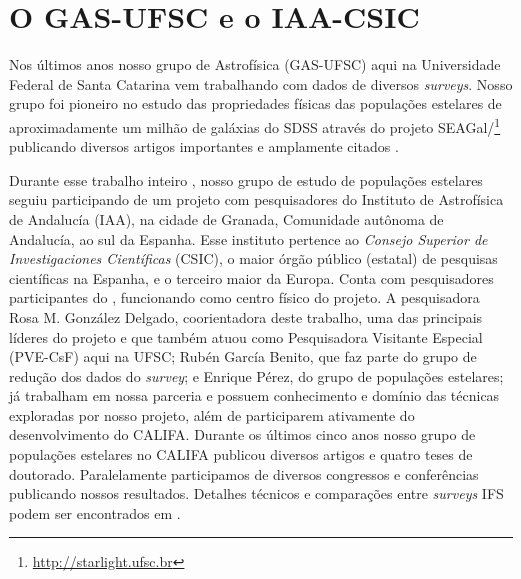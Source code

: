 \section{O GAS-UFSC e o IAA-CSIC}
\label{sec:intro:UFSCeIAA}

Nos últimos anos nosso grupo de Astrofísica (GAS-UFSC) aqui na Universidade Federal de Santa Catarina vem trabalhando com dados de diversos {\em surveys}. Nosso grupo foi pioneiro no estudo das propriedades físicas das populações estelares de aproximadamente um milhão de galáxias do SDSS através do projeto SEAGal/\starlight\footnote{\href{http://starlight.ufsc.br}{http://starlight.ufsc.br}} publicando diversos artigos importantes e amplamente citados \citep[e.g., ][]{CidFernandes.etal.2005a, Mateus.etal.2006a, Stasinska.etal.2006a, Asari.etal.2007a, Stasinska.etal.2008a, CidFernandes.etal.2011a}.

Durante esse trabalho inteiro , nosso grupo de estudo de populações estelares seguiu participando de um projeto com pesquisadores do Instituto de Astrofísica de Andalucía (IAA), na cidade de Granada, Comunidade autônoma de Andalucía, ao sul da Espanha. Esse instituto pertence ao {\em Consejo Superior de Investigaciones Científicas} (CSIC), o maior órgão público (estatal) de pesquisas científicas na Espanha, e o terceiro maior da Europa. Conta com pesquisadores participantes do \CALS, funcionando como centro físico do projeto. A pesquisadora Rosa M. González Delgado, coorientadora deste trabalho, uma das principais líderes do projeto e que também atuou como Pesquisadora Visitante Especial (PVE-CsF) aqui na UFSC; Rubén García Benito, que faz parte do grupo de redução dos dados do {\em survey}; e Enrique Pérez, do grupo de populações estelares; já trabalham em nossa parceria e possuem conhecimento e domínio das técnicas exploradas por nosso projeto, além de participarem ativamente do desenvolvimento do CALIFA. Durante os últimos cinco anos nosso grupo de populações estelares no CALIFA publicou diversos artigos e quatro teses de doutorado. Paralelamente participamos de diversos congressos e conferências publicando nossos resultados. Detalhes técnicos e comparações entre {\em surveys} IFS podem ser encontrados em \citet{Andre2015}.

